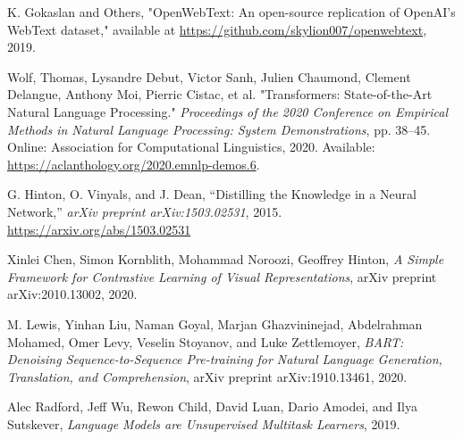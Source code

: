 \documentclass{article}
\begin{document}
    \begin{thebibliography}{9}

        K. Gokaslan and Others,
        "OpenWebText: An open-source replication of OpenAI's WebText dataset,"
        available at \url{https://github.com/skylion007/openwebtext}, 2019.

        Wolf, Thomas, Lysandre Debut, Victor Sanh, Julien Chaumond, Clement Delangue, Anthony Moi, Pierric Cistac, et al.
        "Transformers: State-of-the-Art Natural Language Processing."
        \textit{Proceedings of the 2020 Conference on Empirical Methods in Natural Language Processing: System Demonstrations},
        pp. 38–45. Online: Association for Computational Linguistics, 2020.
        Available: \url{https://aclanthology.org/2020.emnlp-demos.6}.

        G. Hinton, O. Vinyals, and J. Dean,
        ``Distilling the Knowledge in a Neural Network,''
        \emph{arXiv preprint arXiv:1503.02531}, 2015.
        \url{https://arxiv.org/abs/1503.02531}

        Xinlei Chen, Simon Kornblith, Mohammad Noroozi, Geoffrey Hinton,
        \emph{A Simple Framework for Contrastive Learning of Visual Representations},
        arXiv preprint arXiv:2010.13002, 2020.

        M. Lewis, Yinhan Liu, Naman Goyal, Marjan Ghazvininejad, Abdelrahman Mohamed, Omer Levy, Veselin Stoyanov, and Luke Zettlemoyer,
        \emph{BART: Denoising Sequence-to-Sequence Pre-training for Natural Language Generation, Translation, and Comprehension},
        arXiv preprint arXiv:1910.13461, 2020.

        Alec Radford, Jeff Wu, Rewon Child, David Luan, Dario Amodei, and Ilya Sutskever,
        \emph{Language Models are Unsupervised Multitask Learners},
        2019.



    \end{thebibliography}
\end{document}
